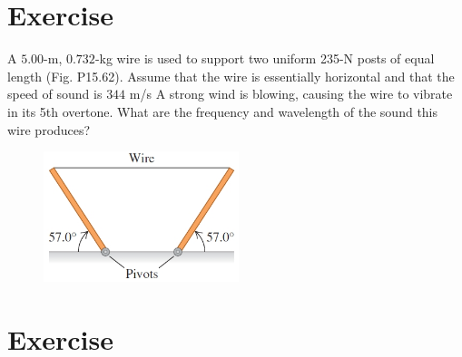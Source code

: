 \documentclass[12pt]{article}
\begin{document}

\section*{Exercise \theexample}

A $5.00$-m, $0.732$-kg wire is used to support two uniform
235-N posts of equal length (Fig. P15.62). Assume that the
wire is essentially horizontal and that the speed of sound is $344$ m/s
A strong wind is blowing, causing the wire to vibrate in
its 5th overtone. What are the frequency and wavelength of the
sound this wire produces?

\vspace{5mm}

 \begin{figure}[h!]
  \begin{center}
    \includegraphics[height=1.5in]{images/1.jpg}
  \end{center}
\end{figure}







\section*{Exercise \theexample}
\end{document}
